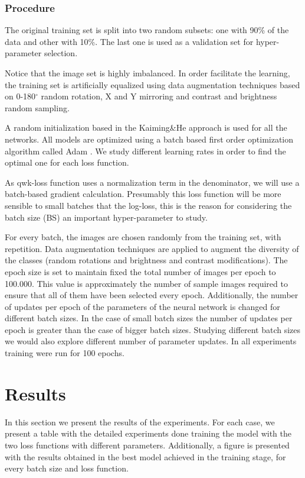 \documentclass[times,twocolumn,final,authoryear]{elsarticle}
\newcommand{\degree}{\ensuremath{^{\circ}}\xspace} %
\begin{document}
\subsubsection{Procedure}

The original training set is split into two random subsets: one with 90\% of the data and other with 10\%. The last one is used as a validation set for hyper-parameter selection. 

Notice that the image set is highly imbalanced. In order facilitate the learning, the training set is artificially equalized using data augmentation techniques \citep{Krizhevsky:2012} based on 0-180\degree random rotation, X and Y mirroring and contrast and brightness random sampling.

A random initialization based in the Kaiming\&He approach \citep{kaiming} is used for all the networks. All models are optimized using a batch based first order optimization algorithm called Adam \citep{DBLP:journals/corr/KingmaB14}. We study different learning rates in order to find the optimal one for each loss function. 

As qwk-loss function uses a normalization term in the denominator, we will use a batch-based gradient calculation. Presumably this loss function will be more sensible to small batches that the log-loss, this is the reason for considering the batch size (BS) an important hyper-parameter to study.

For every batch, the images are chosen randomly from the training set, with repetition. Data augmentation techniques are applied to augment the diversity of the classes (random rotations and brightness and contrast modifications). The epoch size is set to maintain fixed the total number of images per epoch to 100.000. This value is approximately the number of sample images required to ensure that all of them have been selected every epoch. Additionally, the number of updates per epoch of the parameters of the neural network is changed for different batch sizes. In the case of small batch sizes the number of updates per epoch is greater than the case of bigger batch sizes. Studying different batch sizes we would also explore different number of parameter updates. In all experiments training were run for 100 epochs.

\section{Results}

In this section we present the results of the experiments. For each case, we present a table with the detailed experiments done training the model with the two loss functions with different parameters. Additionally, a figure is presented with the results obtained in the best model achieved in the training stage, for every batch size and loss function. 
\end{document}
